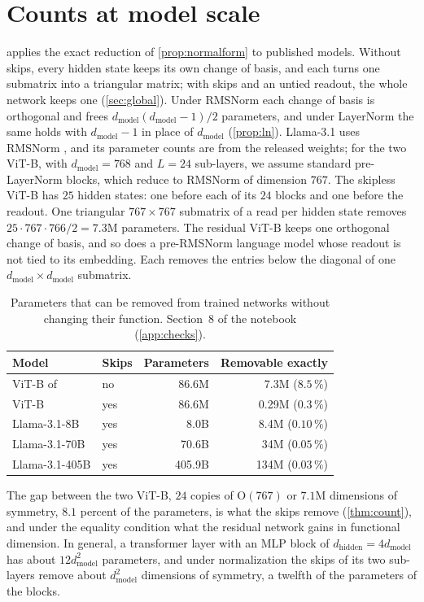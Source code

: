 \documentclass[10pt]{article}
\theoremstyle{definition}
\theoremstyle{remark}
\newcommand{\dm}{d_{\mathrm{model}}}
\newcommand{\dhid}{d_{\mathrm{hidden}}}
\newcommand{\Ort}{\mathrm{O}}
\begin{document}
\FloatBarrier
\section{Counts at model scale}\label{app:scale}

 applies the exact reduction of \cref{prop:normalform} to published models. Without skips, every hidden state keeps its own change of basis, and each turns one submatrix into a triangular matrix; with skips and an untied readout, the whole network keeps one (\cref{sec:global}). Under RMSNorm each change of basis is orthogonal and frees $\dm(\dm-1)/2$ parameters, and under LayerNorm the same holds with $\dm - 1$ in place of $\dm$ (\cref{prop:ln}). Llama-3.1 uses RMSNorm \citep{grattafiori2024llama3}, and its parameter counts are from the released weights; for the two ViT-B, with $\dm = 768$ and $L = 24$ sub-layers, we assume standard pre-LayerNorm blocks, which reduce to RMSNorm of dimension $767$. The skipless ViT-B has $25$ hidden states: one before each of its $24$ blocks and one before the readout. One triangular $767\times767$ submatrix of a read per hidden state removes $25\cdot767\cdot766/2 = 7.3$M parameters. The residual ViT-B keeps one orthogonal change of basis, and so does a pre-RMSNorm language model whose readout is not tied to its embedding. Each removes the entries below the diagonal of one $\dm\times\dm$ submatrix.

\begin{table}[ht]
\centering\small
\caption{Parameters that can be removed from trained networks without changing their function. Section~8 of the notebook (\cref{app:checks}).}
\label{tab:scale}
\begin{tabular}{llrr}
\toprule
Model & Skips & Parameters & Removable exactly \\
\midrule
ViT-B of \citet{ji2026cutting} & no & 86.6M & 7.3M ($8.5\,\%$) \\
ViT-B & yes & 86.6M & 0.29M ($0.3\,\%$) \\
\midrule
Llama-3.1-8B & yes & 8.0B & 8.4M ($0.10\,\%$) \\
Llama-3.1-70B & yes & 70.6B & 34M ($0.05\,\%$) \\
Llama-3.1-405B & yes & 405.9B & 134M ($0.03\,\%$) \\
\bottomrule
\end{tabular}
\end{table}

The gap between the two ViT-B, $24$ copies of $\Ort(767)$ or $7.1$M dimensions of symmetry, $8.1$ percent of the parameters, is what the skips remove (\cref{thm:count}), and under the equality condition what the residual network gains in functional dimension. In general, a transformer layer with an MLP block of $\dhid = 4\dm$ has about $12\dm^2$ parameters, and under normalization the skips of its two sub-layers remove about $\dm^2$ dimensions of symmetry, a twelfth of the parameters of the blocks.
\end{document}
